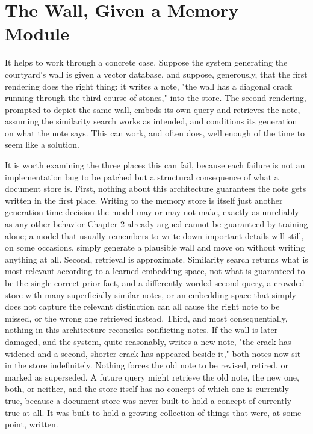 \section{The Wall, Given a Memory Module}

It helps to work through a concrete case. Suppose the system generating the courtyard's wall is given a vector database, and suppose, generously, that the first rendering does the right thing: it writes a note, "the wall has a diagonal crack running through the third course of stones," into the store. The second rendering, prompted to depict the same wall, embeds its own query and retrieves the note, assuming the similarity search works as intended, and conditions its generation on what the note says. This can work, and often does, well enough of the time to seem like a solution.

It is worth examining the three places this can fail, because each failure is not an implementation bug to be patched but a structural consequence of what a document store is. First, nothing about this architecture guarantees the note gets written in the first place. Writing to the memory store is itself just another generation-time decision the model may or may not make, exactly as unreliably as any other behavior Chapter 2 already argued cannot be guaranteed by training alone; a model that usually remembers to write down important details will still, on some occasions, simply generate a plausible wall and move on without writing anything at all. Second, retrieval is approximate. Similarity search returns what is most relevant according to a learned embedding space, not what is guaranteed to be the single correct prior fact, and a differently worded second query, a crowded store with many superficially similar notes, or an embedding space that simply does not capture the relevant distinction can all cause the right note to be missed, or the wrong one retrieved instead. Third, and most consequentially, nothing in this architecture reconciles conflicting notes. If the wall is later damaged, and the system, quite reasonably, writes a new note, "the crack has widened and a second, shorter crack has appeared beside it," both notes now sit in the store indefinitely. Nothing forces the old note to be revised, retired, or marked as superseded. A future query might retrieve the old note, the new one, both, or neither, and the store itself has no concept of which one is currently true, because a document store was never built to hold a concept of currently true at all. It was built to hold a growing collection of things that were, at some point, written.

